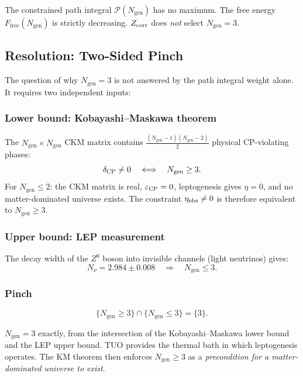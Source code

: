 \documentclass[12pt,a4paper]{article}
\theoremstyle{definition}
\newcommand{\Ngen}{N_{\mathrm{gen}}}
\newcommand{\Ffree}{F_{\mathrm{free}}}
\newcommand{\eps}{\varepsilon}
\begin{document}
\begin{warningbox}
The constrained path integral $\mathcal{P}(\Ngen)$ has no maximum.
The free energy $\Ffree(\Ngen)$ is strictly decreasing.
$Z_{\rm corr}$ does \emph{not} select $\Ngen = 3$.
\end{warningbox}

\subsection{Resolution: Two-Sided Pinch}

The question of why $\Ngen = 3$ is not answered by the path integral
weight alone. It requires two independent inputs:

\subsubsection{Lower bound: Kobayashi--Maskawa theorem}

The $\Ngen\times\Ngen$ CKM matrix contains
$\frac{(\Ngen-1)(\Ngen-2)}{2}$ physical CP-violating phases:
\begin{equation}
  \delta_{\rm CP} \neq 0 \quad\Longleftrightarrow\quad \Ngen \geq 3.
\end{equation}
For $\Ngen \leq 2$: the CKM matrix is real, $\eps_{\rm CP} = 0$,
leptogenesis gives $\eta = 0$, and no matter-dominated universe exists.
The constraint $\eta_{\rm obs} \neq 0$ is therefore equivalent to $\Ngen \geq 3$.

\subsubsection{Upper bound: LEP measurement}

The decay width of the $Z^0$ boson into invisible channels (light neutrinos)
gives:
\begin{equation}
  N_\nu = 2.984 \pm 0.008 \quad\Rightarrow\quad \Ngen \leq 3.
\end{equation}

\subsubsection{Pinch}

\begin{equation}
  \{\Ngen \geq 3\} \cap \{\Ngen \leq 3\} = \{3\}.
\end{equation}

\begin{verdictbox}
$\Ngen = 3$ exactly, from the intersection of the Kobayashi--Maskawa
lower bound and the LEP upper bound.
TUO provides the thermal bath in which leptogenesis operates.
The KM theorem then enforces $\Ngen \geq 3$ as a
\emph{precondition for a matter-dominated universe to exist}.
\end{verdictbox}
\end{document}
